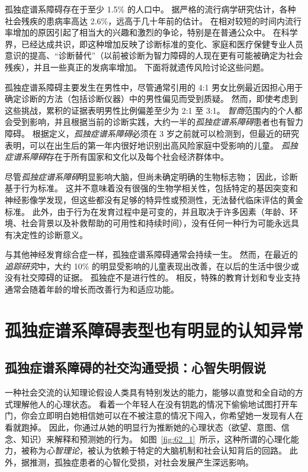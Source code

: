 孤独症谱系障碍存在于至少 1.5\% 的人口中。
据严格的流行病学研究估计，各种社会残疾的患病率高达 2.6\%，远高于几十年前的估计。
在相对较短的时间内流行率增加的原因引起了相当大的兴趣和激烈的争论，特别是在普通公众中。
在科学界，已经达成共识，即这种增加反映了诊断标准的变化、家庭和医疗保健专业人员意识的提高、“诊断替代”（以前被诊断为智力障碍的人现在更有可能被确定为社会残疾），并且一些真正的发病率增加。
下面将就遗传风险讨论这些问题。


孤独症谱系障碍主要发生在男性中，尽管通常引用的 4:1 男女比例最近因担心用于确定诊断的方法（包括诊断仪器）中的男性偏见而受到质疑。
然而，即使考虑到这些挑战，累积的证据表明男性比例偏差至少为 2:1 至 3:1。
\textit{智商}范围内的个人都会受到影响，并且根据当前的诊断实践，大约一半的\textit{孤独症谱系障碍}患者也有智力障碍。
根据定义，\textit{孤独症谱系障碍}必须在 3 岁之前就可以检测到，但最近的研究表明，可以在出生后的第一年内很好地识别出高风险家庭中受影响的儿童。
\textit{孤独症谱系障碍}存在于所有国家和文化以及每个社会经济群体中。


尽管\textit{孤独症谱系障碍}明显影响大脑，但尚未确定明确的生物标志物；
因此，诊断基于行为标准。
这并不意味着没有很强的生物学相关性，包括特定的基因突变和神经影像学发现，但这些都没有足够的特异性或预测性，无法替代临床评估的黄金标准。
此外，由于行为在发育过程中是可变的，并且取决于许多因素（年龄、环境、社会背景以及补救帮助的可用性和持续时间），没有任何一种行为可能永远具有决定性的诊断意义。


与其他神经发育综合症一样，孤独症谱系障碍通常会持续一生。
然而，在最近的\textit{追踪研究}中，大约 10\% 的明显受影响的儿童表现出改善，在以后的生活中很少或没有社交障碍的证据。
孤独症不是进行性的。
相反，特殊的教育计划和专业支持通常会随着年龄的增长而改善行为和适应功能。



\section{孤独症谱系障碍表型也有明显的认知异常}

\subsection{孤独症谱系障碍的社交沟通受损：心智失明假说}

一种社会交流的认知理论假设人类具有特别发达的能力，能够以直觉和全自动的方式理解他人的心理状态。
看着一个年轻人在没有钥匙的情况下偷偷地试图打开车门，你会立即明白她相信她可以在不被注意的情况下闯入，你希望她一发现有人在看就跑掉。
因此，你通过从她的明显行为推断她的心理状态（欲望、意图、信念、知识）来解释和预测她的行为。
如图~\ref{fig:62_1}~所示，这种所谓的心理化能力，被称为\textit{心智理论}，被认为依赖于特定的大脑机制和社会认知背后的回路。
此外，据推测，孤独症患者的心智化受损，对社会发展产生深远影响。



